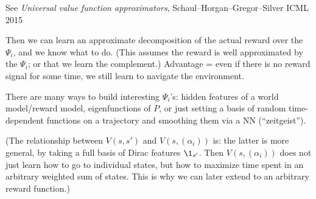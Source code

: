 \documentclass[11pt,a4paper]{article}
\begin{document}
See \emph{Universal value function approximators},
Schaul--Horgan--Gregor--Silver ICML 2015

Then we can learn an approximate decomposition of the actual reward over
the $\Psi_i$, and we know what to do. (This assumes the reward is well
approximated by the $\Psi_i$; or that we learn the complement.) Advantage
= even if there is no reward signal for some time, we still learn to
navigate the environment.

There are many ways to build interesting
$\Psi_i$'s: hidden features of a world model/reward model, eigenfunctions
of $P$, or just setting a basis of random time-dependent functions on a
trajectory and smoothing them via a NN (``zeitgeist'').

(The relationship between $V(s,s')$ and $V(s,(\alpha_i))$ is: the latter
is more general, by taking a full basis of Dirac features $\1_{s'}$. Then
$V(s,(\alpha_i))$ does not just learn how to go to individual states, but
how to maximize time spent in an arbitrary weighted sum of states. This
is why we can later extend to an arbitrary reward function.)
\end{document}
